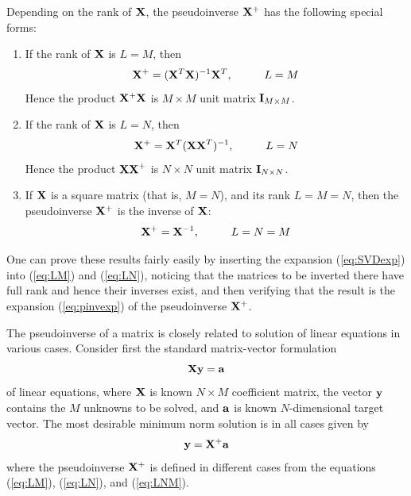 \documentclass[10pt]{article}
\begin{document}
\begin{enumerate}
Depending on the rank of ${\bf X}$, the pseudoinverse ${\bf X}^+$ has the following
special forms: 
%
\begin{enumerate}
\item If the rank of ${\bf X}$ is $L=M$, then
%
\begin{equation}
{\bf X}^+ = ({\bf X}^T{\bf X})^{-1}{\bf X}^T, \hspace{1cm} L=M
\label{eq:LM}
\end{equation}
%
Hence the product ${\bf X}^+{\bf X}$ is $M \times M$ unit matrix ${\bf I}_{M \times M}$.
%
\item If the rank of ${\bf X}$ is $L=N$, then
%
\begin{equation}
{\bf X}^+ = {\bf X}^T({\bf XX}^T)^{-1}, \hspace{1cm} L=N
\label{eq:LN}
\end{equation}
%
Hence the product ${\bf XX}^+$ is $N \times N$ unit matrix ${\bf I}_{N \times N}$.
%
\item If ${\bf X}$ is a square matrix (that is, $M=N$), and its rank $L=M=N$, then
the pseudoinverse ${\bf X}^+$ is the inverse of ${\bf X}$:
%
\begin{equation}
{\bf X}^+ = {\bf X}^{-1}, \hspace{1cm} L=N=M
\label{eq:LNM}
\end{equation}
% 
\end{enumerate}
%
One can prove these results fairly easily by inserting the expansion (\ref{eq:SVDexp})
into (\ref{eq:LM}) and (\ref{eq:LN}), noticing that the matrices to be inverted there
have full rank and hence their inverses exist, and then verifying that the result is
the expansion (\ref{eq:pinvexp}) of the pseudoinverse ${\bf X}^+$.

The pseudoinverse of a matrix is closely related to solution of linear equations in 
various cases. Consider first the standard matrix-vector formulation 
%
\begin{equation}
{\bf X}{\bf y} = {\bf a}
\label{eq:Xya}
\end{equation}
% 
of linear equations, where ${\bf X}$ is known $N \times M$ coefficient matrix,
the vector ${\bf y}$ contains the $M$ unknowns to be solved, and ${\bf a}$ is
known $N$-dimensional target vector. The most desirable minimum norm solution is in
all cases given by
%
\begin{equation}
{\bf y} = {\bf X}^+{\bf a}
\label{eq:y}
\end{equation}
% 
where the pseudoinverse ${\bf X}^+$ is defined in different cases from the equations
(\ref{eq:LM}), (\ref{eq:LN}), and (\ref{eq:LNM}). 


\end{enumerate}
\end{document}
